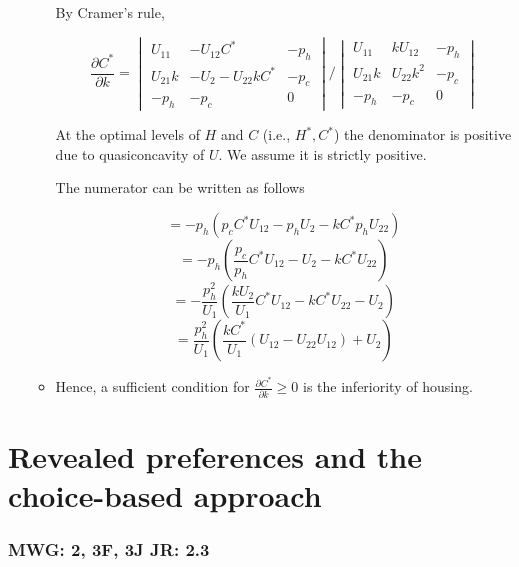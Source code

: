 \documentclass{article}
\begin{document}
\begin{enumerate}
\begin{itemize}
            By Cramer's rule,
                            
                \[
                \frac{\partial C^*}{\partial k} = 
                \begin{vmatrix}
                U_{11} & -U_{12} C^* & -p_h \\
                U_{21} k & -U_2 - U_{22} k C^* & -p_c \\
                -p_h & -p_c & 0 
                \end{vmatrix} \Bigg/ 
                \begin{vmatrix}
                U_{11} & k U_{12} & -p_h \\
                U_{21} k & U_{22} k^2 & -p_c \\
                -p_h & -p_c & 0 
                \end{vmatrix}
                \]

            At the optimal levels of \( H \) and \( C \) (i.e., \( H^*, C^* \)) the denominator is positive due to quasiconcavity of \( U \). We assume it is strictly positive.
            
            The numerator can be written as follows
            
            \[
            = -p_h \left( p_c C^* U_{12} - p_h U_2 - k C^* p_h U_{22} \right)
            \]
            \[
            = -p_h \left( \frac{p_c}{p_h} C^* U_{12} - U_2 - k C^* U_{22} \right)
            \]
            \[
            = -\frac{p_h^2}{U_1} \left( \frac{k U_2}{U_1} C^* U_{12} - k C^* U_{22} - U_2 \right)
            \]
            \[
            = \frac{p_h^2}{U_1} \left( \frac{k C^*}{U_1} \left( U_{12} - U_{22} U_{12} \right) + U_2 \right)
            \]

            \item Hence, a sufficient condition for \( \frac{\partial C^*}{\partial k} \geq 0 \) is the inferiority of housing.
            \end{itemize}

\end{enumerate}


\newpage
\section{Revealed preferences and the choice-based approach}
\subsubsection*{MWG: 2, 3F, 3J JR: 2.3}
\end{document}
